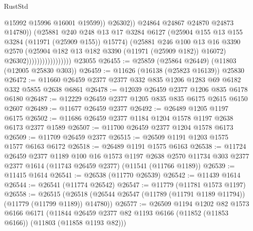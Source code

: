 \begin{lexlean}{RustStd}
\begin{coremodule}
                                              @15992
                                              @15996
                                              @16001
                                              @19599))
                                          @26302))
                                      @24864
                                      @24867
                                      @24870
                                      @24873
                                      @14780))
                                  (@25881
                                    @240
                                    @248
                                    @13
                                    @17
                                    @3284
                                    @6127
                                    (@25904 @155 @13 @155 @3284 (@11971 (@25909 @155)) @15774)
                                    (@25881
                                      @246
                                      @100
                                      @13
                                      @16
                                      @3390
                                      @2570
                                      (@25904 @182 @13 @182 @3390 (@11971 (@25909 @182)) @16072)
                                      @26302)))))))))))))))))
    @23055
@26455 := @25859 (@25864 @26449) (@11803 (@12005 @25830 @303))
@26459 := @11626 (@16138 (@25823 @16139)) @25830
@26472 := @11660 @26459 @2377 @2377 @332 @835 @1206 @1283 @69 @6182 @332 @5855 @2638 @6861
@26478 := @12039 @26459 @2377 @1206 @835 @6178 @6180
@26487 := @12229 @26459 @2377 @1205 @835 @835 @6175 @2615 @6150 @2607
@26489 := @11677 @26459 @2377
@26492 := @26489 @1205 @1197 @6175
@26502 := @11686 @26459 @2377 @1184 @1204 @1578 @1197 @2638 @6173 @2377 @1589
@26507 := @11700 @26459 @2377 @1204 @1578 @6173
@26509 := @11709 @26459 @2377
@26515 := @26509 @1191 @1203 @1575 @1577 @6163 @6172
@26518 := @26489 @1191 @1575 @6163
@26538 := @11724
    @26459
    @2377
    @1189
    @100
    @16
    @1573
    @1197
    @2638
    @2570
    @11734
    @303
    @2377
    @2377
    @1614
    (@11743 @26459 @2377)
    (@11541 (@11766 @1189))
@26539 := @11415 @1614
@26541 := @26538 (@11770 @26539)
@26542 := @11439 @1614
@26544 := @26541 (@11774 @26542)
@26547 := @11779 (@11781 @1573 @1197)
@26558 := @26515
    (@26518 (@26544 @26547 (@11789 (@11791 @1189 @11794)) (@11779 (@11799 @1189)) @14780))
@26577 := @26509
    @1194
    @1202
    @82
    @1573
    @6166
    @6171
    (@11844 @26459 @2377 @82 @1193 @6166 (@11852 (@11853 @6166)) (@11803 (@11858 @1193 @82)))

\end{coremodule}
\end{lexlean}

